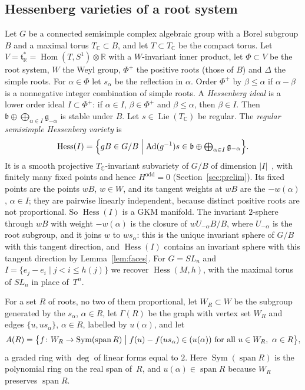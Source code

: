 \documentclass[11pt,a4paper]{article}
\numberwithin{equation}{section}
\theoremstyle{plain}
\theoremstyle{definition}
\theoremstyle{remark}
\newcommand{\R}{\mathbb{R}}
\newcommand{\C}{\mathbb{C}}
\DeclareMathOperator{\Hess}{Hess}
\DeclareMathOperator{\Sym}{Sym}
\DeclareMathOperator{\Hom}{Hom}
\DeclareMathOperator{\spn}{span}
\begin{document}
\subsection{Hessenberg varieties of a root system}
Let $G$ be a connected semisimple complex algebraic group with a Borel subgroup $B$ and a maximal torus $T_\C\subset B$, and let $T\subset T_\C$ be the compact torus. Let $V=\mathfrak t^*_\R=\Hom(T,S^1)\otimes\R$ with a $W$-invariant inner product, let $\Phi\subset V$ be the root system, $W$ the Weyl group, $\Phi^+$ the positive roots (those of $B$) and $\Delta$ the simple roots. For $\alpha\in\Phi$ let $s_\alpha$ be the reflection in $\alpha$. Order $\Phi^+$ by $\beta\leqslant\alpha$ if $\alpha-\beta$ is a nonnegative integer combination of simple roots. A \emph{Hessenberg ideal} is a lower order ideal $I\subset\Phi^+$: if $\alpha\in I$, $\beta\in\Phi^+$ and $\beta\leqslant\alpha$, then $\beta\in I$. Then $\mathfrak b\oplus\bigoplus_{\alpha\in I}\mathfrak g_{-\alpha}$ is stable under $B$. Let $s\in\operatorname{Lie}(T_\C)$ be regular. The \emph{regular semisimple Hessenberg variety} is
\[
\Hess(I)=\Bigl\{gB\in G/B\Bigm|\operatorname{Ad}(g^{-1})s\in\mathfrak b\oplus\textstyle\bigoplus_{\alpha\in I}\mathfrak g_{-\alpha}\Bigr\}.
\]
It is a smooth projective $T_\C$-invariant subvariety of $G/B$ of dimension $|I|$~\cite{DPS92}, with finitely many fixed points and hence $H^{\mathrm{odd}}=0$ (Section~\ref{sec:prelim}). Its fixed points are the points $wB$, $w\in W$, and its tangent weights at $wB$ are the $-w(\alpha)$, $\alpha\in I$; they are pairwise linearly independent, because distinct positive roots are not proportional. So $\Hess(I)$ is a GKM manifold. The invariant $2$-sphere through $wB$ with weight $-w(\alpha)$ is the closure of $wU_{-\alpha}B/B$, where $U_{-\alpha}$ is the root subgroup, and it joins $w$ to $ws_\alpha$: this is the unique invariant sphere of $G/B$ with this tangent direction, and $\Hess(I)$ contains an invariant sphere with this tangent direction by Lemma~\ref{lem:faces}. For $G=SL_n$ and $I=\{e_j-e_i\mid j<i\leqslant h(j)\}$ we recover $\Hess(M,h)$, with the maximal torus of $SL_n$ in place of~$T^n$.

For a set $R$ of roots, no two of them proportional, let $W_R\subset W$ be the subgroup generated by the $s_\alpha$, $\alpha\in R$, let $\Gamma(R)$ be the graph with vertex set $W_R$ and edges $\{u,us_\alpha\}$, $\alpha\in R$, labelled by $u(\alpha)$, and let
\[
A(R)=\bigl\{f\colon W_R\to\Sym(\spn R)\bigm| f(u)-f(us_\alpha)\in(u(\alpha))\text{ for all }u\in W_R,\ \alpha\in R\bigr\},
\]
a graded ring with $\deg$ of linear forms equal to $2$. Here $\Sym(\spn R)$ is the polynomial ring on the real span of~$R$, and $u(\alpha)\in\spn R$ because $W_R$ preserves $\spn R$.
\end{document}
